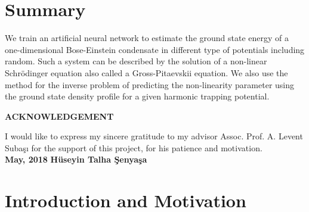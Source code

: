 \documentclass[a4paper,times,hidelinks,12pt]{article}
\begin{document}
\setcounter{page}{1}

\section*{Summary}

We train an artificial neural network to estimate the ground state energy
of a one-dimensional Bose-Einstein condensate in different type of potentials including random.
Such a system can be described by the solution of a non-linear Schr{\"o}dinger equation also called a Gross-Pitaevskii equation. We also use the method for the inverse problem of predicting the non-linearity parameter using the ground
state density profile for a given harmonic trapping potential.
\vspace*{\fill}


\newpage

\begin{center}
\vspace*{4 cm}
\textbf{ACKNOWLEDGEMENT} \\[10 pt]
\end{center}
I would like to express my sincere gratitude to my advisor  Assoc. Prof. A. Levent Suba\c{s}{\i} for the support of this project, for his patience and motivation.\\
\textbf{May, 2018} \hspace{7.75 cm}\textbf{H{\"u}seyin Talha \c{S}enya\c{s}a}


\vspace*{\fill}

\newpage
\tableofcontents

\newpage

\section{Introduction and Motivation}


\label{sec:Intro}
\end{document}
